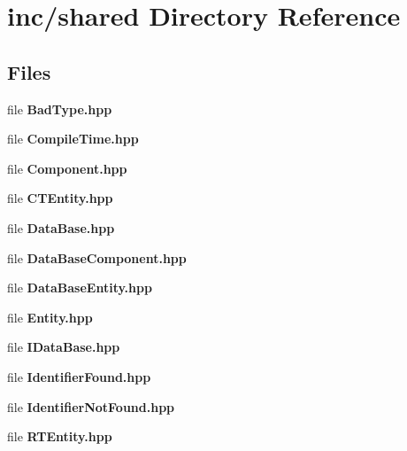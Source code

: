 \section{inc/shared Directory Reference}
\label{dir_ecda0f287c307d056b3c2cb239b6c6d3}
\subsection*{Files}
\begin{DoxyCompactItemize}
\item 
file {\bf Bad\+Type.\+hpp}
\item 
file {\bf Compile\+Time.\+hpp}
\item 
file {\bf Component.\+hpp}
\item 
file {\bf C\+T\+Entity.\+hpp}
\item 
file {\bf Data\+Base.\+hpp}
\item 
file {\bf Data\+Base\+Component.\+hpp}
\item 
file {\bf Data\+Base\+Entity.\+hpp}
\item 
file {\bf Entity.\+hpp}
\item 
file {\bf I\+Data\+Base.\+hpp}
\item 
file {\bf Identifier\+Found.\+hpp}
\item 
file {\bf Identifier\+Not\+Found.\+hpp}
\item 
file {\bf R\+T\+Entity.\+hpp}
\end{DoxyCompactItemize}
